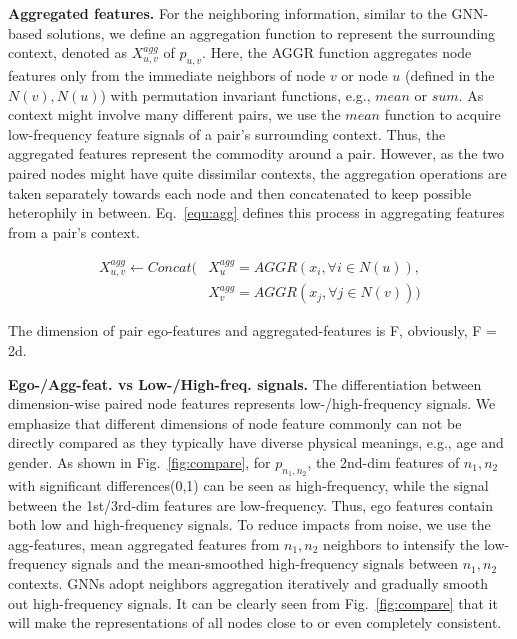 \documentclass[10pt,journal,compsoc]{IEEEtran}
\begin{document}
\noindent\textbf{Aggregated features.}
For the neighboring information, similar to the GNN-based solutions, we define an aggregation function to represent the surrounding context, denoted as $ X^{agg}_{u,v}$ of $p_{u,v}$. Here, the AGGR function aggregates node features only from the immediate neighbors of node $v$ or node $u$ (defined in the  $N(v), N(u)$) with permutation invariant functions, e.g., $mean$ or $sum$. As context might involve many different pairs, we use the $mean$ function to acquire low-frequency feature signals of a pair's surrounding context. Thus, the aggregated features represent the commodity around a pair. However, as the two paired nodes might have quite dissimilar contexts, the aggregation operations are taken separately towards each node and then concatenated to keep possible heterophily in between. Eq.~\ref{equ:agg} defines this process in aggregating features from a pair's context.

\begin{equation} 
\begin{aligned}
X^{agg}_{u,v} \gets Concat(&X^{agg}_u = AGGR(x_i,\forall i\in N(u)),\\&X^{agg}_v=AGGR(x_j,\forall j\in N(v)))
\end{aligned}
\label{equ:agg}
\end{equation}

The dimension of pair ego-features and aggregated-features is F, obviously, F = 2d.


\noindent\textbf{Ego-/Agg-feat. vs Low-/High-freq. signals.} The differentiation between dimension-wise paired node features represents low-/high-frequency signals. We emphasize that different dimensions of node feature commonly can not be directly compared as they typically have diverse physical meanings, e.g., age and gender. As shown in  Fig.~\ref{fig:compare}, for $p_{n_1,n_2}$, the 2nd-dim features of $n_1, n_2$ with significant differences(0,1) can be seen as high-frequency, while the signal between the 1st/3rd-dim features are low-frequency. Thus, ego features contain both low and high-frequency signals. To reduce impacts from noise, we use the agg-features, mean aggregated features from $n_1,n_2$ neighbors to intensify the low-frequency signals and the mean-smoothed high-frequency signals between $n_1,n_2$ contexts. GNNs adopt neighbors aggregation iteratively and gradually smooth out high-frequency signals. It can be clearly seen from Fig.~\ref{fig:compare} that it will make the representations of all nodes close to or even completely consistent.
\end{document}
